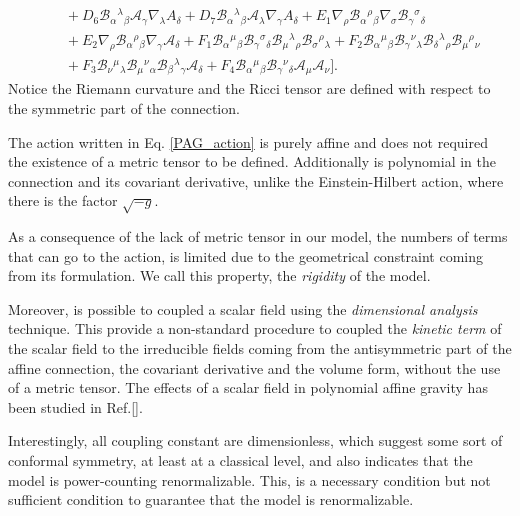 \documentclass{article}
\begin{document}
\begin{equation}
\begin{split}
    &\quad
    + D_6 \mathcal{B}_{\alpha}{}^{\lambda}{}_{\beta}\mathcal{A}_\gamma \nabla_\lambda A_\delta
    + D_7\mathcal{B}_{\alpha}{}^{\lambda}{}_{\beta} \mathcal{A}_\lambda \nabla_\gamma A_\delta
    + E_1\nabla_\rho \mathcal{B}_{\alpha}{}^{\rho}{}_{\beta} \nabla_\sigma \mathcal{B}_{\gamma}{}^{\sigma}{}_{\delta}
    \\
    &\quad
    + E_2 \nabla_\rho \mathcal{B}_{\alpha}{}^{\rho}{}_{\beta} \nabla_\gamma \mathcal{A}_\delta
    + F_1 \mathcal{B}_{\alpha}{}^{\mu}{}_{\beta} \mathcal{B}_{\gamma}{}^{\sigma}{}_{\delta} \mathcal{B}_{\mu}{}^{\lambda}{}_{\rho} \mathcal{B}_{\sigma}{}^{\rho}{}_{\lambda}
    + F_2\mathcal{B}_{\alpha}{}^{\mu}{}_{\beta} \mathcal{B}_{\gamma}{}^{\nu}{}_{\lambda} \mathcal{B}_{\delta}{}^{\lambda}{}_{\rho} \mathcal{B}_{\mu}{}^{\rho}{}_{\nu}
    \\
    &\quad
    + F_3 \mathcal{B}_{\nu}{}^{\mu}{}_{\lambda} \mathcal{B}_{\mu}{}^{\nu}{}_{\alpha} \mathcal{B}_{\beta}{}^{\lambda}{}_{\gamma} \mathcal{A}_\delta
    + F_4 \mathcal{B}_{\alpha}{}^{\mu}{}_{\beta}\mathcal{B}_{\gamma}{}^{\nu}{}_{\delta}\mathcal{A}_\mu \mathcal{A}_\nu \bigg].
    \end{split}
\end{equation}
Notice the Riemann curvature and the Ricci tensor are defined with respect to the symmetric part
of the connection.

The action written in Eq. \eqref{PAG_action} is purely affine and does not required the 
existence of a metric tensor to be defined. Additionally is polynomial in the connection
and its covariant derivative, unlike the Einstein-Hilbert action, where there is 
the factor $\sqrt{-g}$.

As a consequence of the lack of metric tensor in our model, the numbers of terms that can
go to the action, is limited due to the geometrical constraint coming from its formulation. 
We call this property, the \textit{rigidity} of the model. 

Moreover, is possible to coupled a scalar field using the \textit{dimensional analysis}
technique. This provide a non-standard procedure to coupled the \textit{kinetic term}
of the scalar field to the irreducible fields coming from the antisymmetric part
of the affine connection, the covariant derivative and the volume form, without the 
use of a metric tensor. The effects of a scalar field in polynomial affine gravity 
has been studied in Ref.[].

Interestingly, all coupling constant are dimensionless, which suggest some sort of
conformal symmetry, at least at a classical level, and also indicates that the
model is power-counting renormalizable. This, is a necessary condition but not
sufficient condition to guarantee that the model is renormalizable.
\end{document}
